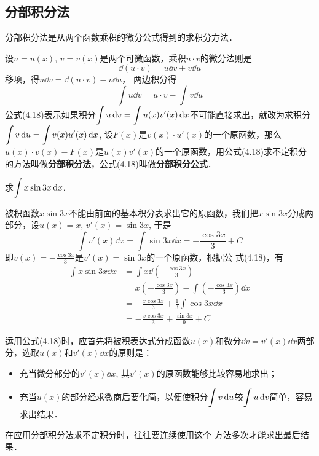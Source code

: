 \subsection{分部积分法}

分部积分法是从两个函数乘积的微分公式得到的求积分方法．

设$u=u(x)$, $v=v(x)$是两个可微函数，乘积$u\cdot v$的微分法则是$$\dd (u\cdot v) =u\dd v+v\dd u$$
移项，得$u\dd v=\dd (u\cdot v) -v\dd u$，
两边积分得
\begin{equation}
    \int u\dd v=u\cdot v-\int v\dd u
\end{equation}
公式(4.18)表示如果积分$\displaystyle\int u\,{\rm d} v=\displaystyle\int u(x)v'(x)\,{\rm d} x$不可能直接求出，就改为求积分$\displaystyle\int v\,{\rm d} u=\displaystyle\int v(x)u'(x)\,{\rm d} x$, 设$F(x)$是$v(x)\cdot u'(x)$的一个原函数，那么$u(x)\cdot v(x)-F(x)$是$u(x)v'(x)$的一个原函数，用公式(4.18)求不定积分的方法叫做\textbf{分部积分法}，公式(4.18)叫做\textbf{分部积分公式}．

\begin{example}
    求$\displaystyle\int x\sin 3x\,{\rm d} x$.
\end{example}

\begin{solution}
被积函数$x\sin3x$不能由前面的基本积分表求出它的原函数，我们把$x\sin3x$分成两部分，设$u(x)=x$, $v'(x)=\sin3x$, 于是
\[\int v' (x) \dd x= \int \sin3x\dd x=-\frac{\cos3x}{3}+C\]
即$v(x)=-\frac{\cos3x}{3}$是$v'(x)=\sin3x$的一个原函数，根据公
式(4.18)，有
\[\begin{split}
    \int x\sin 3x\dd x&=\int x\dd\left(-\frac{\cos 3x}{3}\right)\\
    &=x\left(-\frac{\cos 3x}{3}\right)-\int\left(-\frac{\cos3x}{3}\right)\dd x \\
&=-\frac{x\cos 3x}{3}+\frac{1}{3}\int \cos 3x\dd x\\
&=-\frac{x\cos 3x}{3}+\frac{\sin 3x}{9}+C
\end{split}\]
\end{solution}

运用公式(4.18)时，应首先将被积表达式分成函数$u(x)$和微分$\dd v=v'(x)\dd x$两部分，选取$u(x)$和$v'(x)\dd x$的原则是：
\begin{itemize}
    \item 充当微分部分的$v'(x)\dd x$, 其$v'(x)$的原函数能够比较容易地求出；
\item 
充当$u(x)$的部分经求微商后要化简，以便使积分$\displaystyle\int v\,{\rm d} u$较$\displaystyle\int u\,{\rm d} v$简单，容易求出结果．
\end{itemize}

在应用分部积分法求不定积分时，往往要连续使用这个
方法多次才能求出最后结果．

